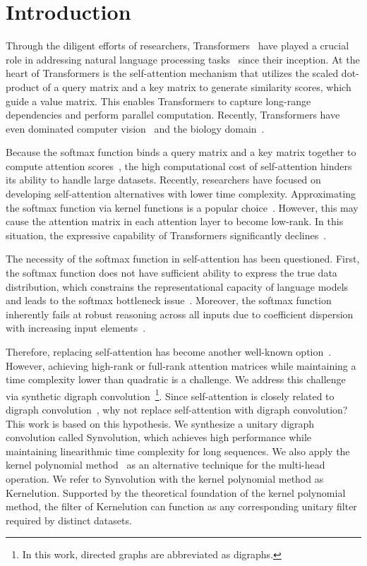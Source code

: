 \section{Introduction}
Through the diligent efforts of researchers, Transformers~\citep{NIPS2017_3f5ee243} have played a crucial role in addressing natural language processing tasks~\citep{devlin-etal-2019-bert} since their inception. At the heart of Transformers is the self-attention mechanism that utilizes the scaled dot-product of a query matrix and a key matrix to generate similarity scores, which guide a value matrix. This enables Transformers to capture long-range dependencies and perform parallel computation. Recently, Transformers have even dominated computer vision~\citep{dosovitskiy2021an} and the biology domain~\citep{10.1145/3388440.3412467}.

Because the softmax function binds a query matrix and a key matrix together to compute attention scores~\citep{NIPS2017_3f5ee243}, the high computational cost of self-attention hinders its ability to handle large datasets. Recently, researchers have focused on developing self-attention alternatives with lower time complexity. Approximating the softmax function via kernel functions is a popular choice~\citep{tsai-etal-2019-transformer,choromanski2021rethinking,zhen2022cosformer}. However, this may cause the attention matrix in each attention layer to become low-rank. In this situation, the expressive capability of Transformers significantly declines~\citep{pmlr-v139-dong21a}.

The necessity of the softmax function in self-attention has been questioned. First, the softmax function does not have sufficient ability to express the true data distribution, which constrains the representational capacity of language models and leads to the softmax bottleneck issue~\citep{yang2018breaking}. Moreover, the softmax function inherently fails at robust reasoning across all inputs due to coefficient dispersion with increasing input elements~\citep{velickovic2024softmax}.

Therefore, replacing self-attention has become another well-known option~\citep{pmlr-v139-tay21a,lee-thorp-etal-2022-fnet,9878955}. However, achieving high-rank or full-rank attention matrices while maintaining a time complexity lower than quadratic is a challenge. We address this challenge via synthetic digraph convolution~\footnote{In this work, directed graphs are abbreviated as digraphs.}. Since self-attention is closely related to digraph convolution~\citep{NEURIPS2020_c8512d14}, why not replace self-attention with digraph convolution? This work is based on this hypothesis. We synthesize a unitary digraph convolution called Synvolution, which achieves high performance while maintaining linearithmic time complexity for long sequences. We also apply the kernel polynomial method~\citep{10.1142/S0129183194000842,PhysRevB.49.10154,PhysRevLett.73.1039,Vijay2004,RevModPhys.78.275,Weiße2008} as an alternative technique for the multi-head operation. We refer to Synvolution with the kernel polynomial method as Kernelution. Supported by the theoretical foundation of the kernel polynomial method, the filter of Kernelution can function as any corresponding unitary filter required by distinct datasets.

